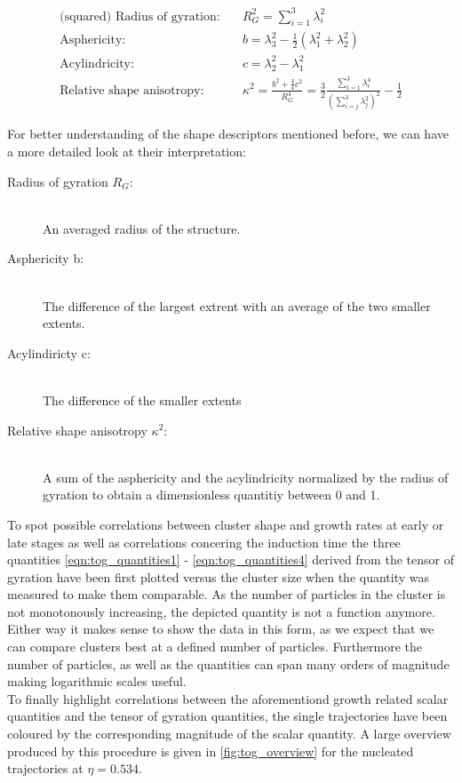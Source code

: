 \begin{align}
\label{eqn:tog_quantities1}
\text{(squared) Radius of gyration:} \quad &R_G^2 = \sum_{i=1}^3 \lambda_i^2\\
\label{eqn:tog_quantities2}
\text{Asphericity:} \quad &b = \lambda_3^2 - \frac{1}{2}(\lambda_1^2+\lambda_2^2)\\
\label{eqn:tog_quantities3}
\text{Acylindricity:} \quad &c = \lambda_2^2 - \lambda_1^2\\
\label{eqn:tog_quantities4}
\text{Relative shape anisotropy:} \quad &\kappa^2 = \frac{b^2 + \frac{3}{4} c^2 }{R_G^4} =  \frac{3}{2} \frac{ \sum_{i=1}^3 \lambda_i^4 }{\left(\sum_{i=j}^3 \lambda_j^2 \right) ^2 } - \frac{1}{2}
\end{align}

For better understanding of the shape descriptors mentioned before, we can have a more detailed look at their interpretation:

\begin{description}
\item[Radius of gyration $R_G$:] \hfill \\ An averaged radius of the structure.
\item[Asphericity b:]\hfill \\ The difference of the largest extrent with an average of the two smaller extents. 
\item[Acylindiricty c:] \hfill \\ The difference of the smaller extents
\item[Relative shape anisotropy $\kappa^2$:] \hfill \\ A sum of the asphericity and the acylindricity normalized by the radius of gyration to obtain a dimensionless quantitiy between 0 and 1.
\end{description}



To spot possible correlations between cluster shape and growth rates at early or late stages as well as correlations concering the induction time the three quantities \autoref{eqn:tog_quantities1} - \ref{eqn:tog_quantities4} derived from the tensor of gyration have been first plotted versus the cluster size when the quantity was measured to make them comparable. As the number of particles in the cluster is not monotonously increasing, the depicted quantity is not a function anymore. Either way it makes sense to show the data in this form, as we expect that we can compare clusters best at a defined number of particles. Furthermore the number of particles, as well as the quantities can span many orders of magnitude making logarithmic scales useful.\\
To finally highlight correlations between the aforementiond growth related scalar quantities and the tensor of gyration quantities, the single trajectories have been coloured by the corresponding magnitude of the scalar quantity. A large overview produced by this procedure is given in \autoref{fig:tog_overview} for the nucleated trajectories at $\eta=0.534$.

